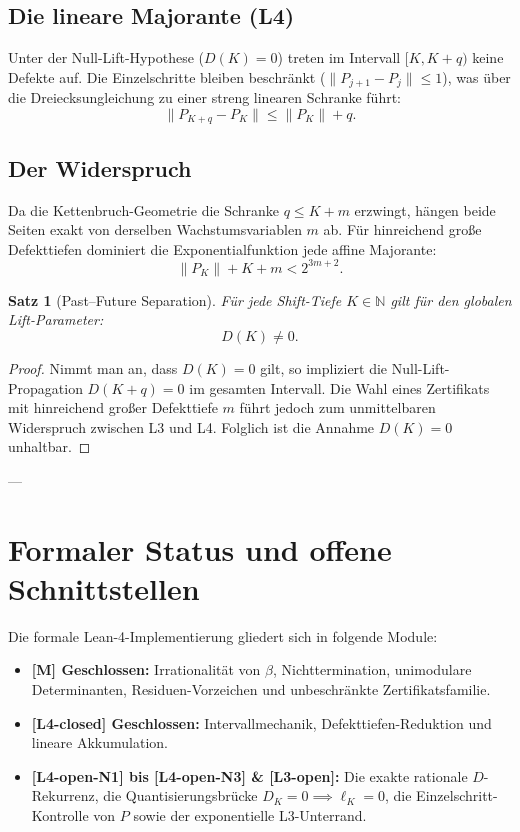 \documentclass[11pt,a4paper]{article}
\newtheorem{theorem}{Satz}[section]
\theoremstyle{definition}
\begin{document}
	\subsection{Die lineare Majorante (L4)}
	Unter der Null-Lift-Hypothese ($D(K) = 0$) treten im Intervall $[K, K+q)$ keine Defekte auf. Die Einzelschritte bleiben beschränkt ($\|P_{j+1} - P_j\| \le 1$), was über die Dreiecksungleichung zu einer streng linearen Schranke führt:
	\begin{equation}
		\|P_{K+q} - P_K\| \le \|P_K\| + q.
	\end{equation}
	
	\subsection{Der Widerspruch}
	Da die Kettenbruch-Geometrie die Schranke $q \le K + m$ erzwingt, hängen beide Seiten exakt von derselben Wachstumsvariablen $m$ ab. Für hinreichend große Defekttiefen dominiert die Exponentialfunktion jede affine Majorante:
	\begin{equation}
		\|P_K\| + K + m < 2^{3m + 2}.
	\end{equation}
	
	\begin{theorem}[Past--Future Separation]
		Für jede Shift-Tiefe $K \in \mathbb{N}$ gilt für den globalen Lift-Parameter:
		\begin{equation}
			D(K) \neq 0.
		\end{equation}
	\end{theorem}
	\begin{proof}
		Nimmt man an, dass $D(K) = 0$ gilt, so impliziert die Null-Lift-Propagation $D(K+q) = 0$ im gesamten Intervall. Die Wahl eines Zertifikats mit hinreichend großer Defekttiefe $m$ führt jedoch zum unmittelbaren Widerspruch zwischen L3 und L4. Folglich ist die Annahme $D(K) = 0$ unhaltbar.
	\end{proof}
	
	---
	
	\section{Formaler Status und offene Schnittstellen}
	
	Die formale Lean-4-Implementierung gliedert sich in folgende Module:
	\begin{itemize}
		\item \textbf{[M] Geschlossen:} Irrationalität von $\beta$, Nichttermination, unimodulare Determinanten, Residuen-Vorzeichen und unbeschränkte Zertifikatsfamilie.
		\item \textbf{[L4-closed] Geschlossen:} Intervallmechanik, Defekttiefen-Reduktion und lineare Akkumulation.
		\item \textbf{[L4-open-N1] bis [L4-open-N3] \& [L3-open]:} Die exakte rationale $D$-Rekurrenz, die Quantisierungsbrücke $D_K = 0 \implies \ell_K = 0$, die Einzelschritt-Kontrolle von $P$ sowie der exponentielle L3-Unterrand.
	\end{itemize}
	
\end{document}
